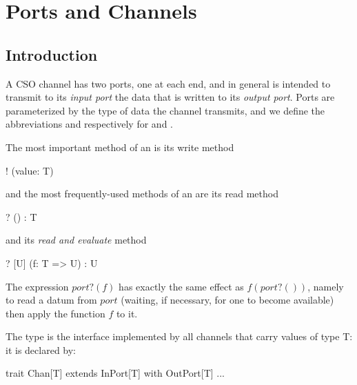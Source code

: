 \documentclass[12pt]{IOS-Book-Article-CPA-2017}
\begin{document}
\begin{comment}
\subsection{Starting and running background processes}
It can sometimes simplify the construction of a large system to
have processes that run (more or less permanently) in the background.
%
If $p$ is a process, then evaluation of the expression $p~$\textscala{fork}
starts $p$ in a new thread that runs concurrently with
the current thread. The value of the expression is a  \textscala{process.Handle}
associated with the newly started thread and can be used to discover when
(and how) the thread terminates. 
\end{comment}

\section{Ports and Channels}

\subsection{Introduction}
A CSO channel has two ports, one at each end, and in general is intended to transmit
to its \textit{input port} the data that is written to its \textit{output port}. Ports
are parameterized by the type of data the channel transmits, and we define the abbreviations
 and \textscala{!![T]} respectively for
 and .

The most important method of 
an \textscala{!![T]} is its write method
\begin{code}[]
    ! (value: T) 
\end{code}
and the most frequently-used methods of
an  are its read method
\begin{code}[]
    ? () : T
\end{code}
and its \textit{read and evaluate} method 
\begin{code}[]
    ? [U] (f: T => U) : U 
\end{code}
The expression $port?(f)$ has exactly the same
effect as $f(port?())$, namely to read a datum from $port$ 
(waiting, if necessary, for one to become available) then apply 
the function $f$ to it.

The type  is the interface implemented by all
channels that carry values of type \textsc{T}: it is declared by:
\begin{code}[]
    trait  Chan[T] extends InPort[T] with OutPort[T] { ... }
\end{code}
\end{document}
